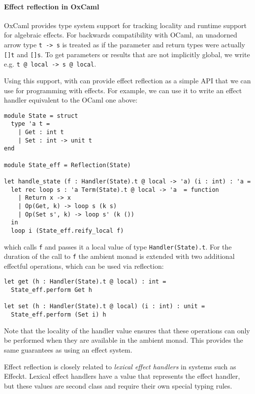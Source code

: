 \documentclass[acmsmall, screen, nonacm]{acmart}
\theoremstyle{definition}
\begin{document}
\paragraph{Effect reflection in OxCaml}
OxCaml\cite{lorenzen2024oxidizing} provides type system support for
tracking locality and runtime support for algebraic effects. For
backwards compatibility with OCaml, an unadorned arrow type
\lstinline[style=oxcaml]{t -> s} is treated as if the parameter and
return types were actually \lstinline[style=oxcaml]{[]t} and
\lstinline[style=oxcaml]{[]s}. To get parameters or results that are not
implicitly global, we write
e.g. \lstinline[style=oxcaml]{t @ local -> s @ local}.

Using this support, with can provide effect reflection as a simple API
that we can use for programming with effects.  For example, we can use
it to write an effect handler equivalent to the OCaml one above:
\begin{lstlisting}[style=oxcaml]
module State = struct
  type 'a t =
    | Get : int t
    | Set : int -> unit t
end

module State_eff = Reflection(State)

let handle_state (f : Handler(State).t @ local -> 'a) (i : int) : 'a =
  let rec loop s : 'a Term(State).t @ local -> 'a  = function
    | Return x -> x
    | Op(Get, k) -> loop s (k s)
    | Op(Set s', k) -> loop s' (k ())
  in
  loop i (State_eff.reify_local f)
\end{lstlisting}
which calls \lstinline[style=oxcaml]{f} and passes it a local value of
type \lstinline[style=oxcaml]{Handler(State).t}. For the duration of the
call to \lstinline[style=oxcaml]{f} the ambient monad is extended with
two additional effectful operations, which can be used via reflection:
\begin{lstlisting}[style=oxcaml]
let get (h : Handler(State).t @ local) : int =
  State_eff.perform Get h

let set (h : Handler(State).t @ local) (i : int) : unit =
  State_eff.perform (Set i) h
\end{lstlisting}

Note that the locality of the handler value ensures that these
operations can only be performed when they are available in the ambient
monad. This provides the same guarantees as using an effect system.

Effect reflection is closely related to \emph{lexical effect handlers} in
systems such as Effeckt\cite{??}. Lexical effect handlers have a value that
represents the effect handler, but these values are second class and
require their own special typing rules.
\end{document}
